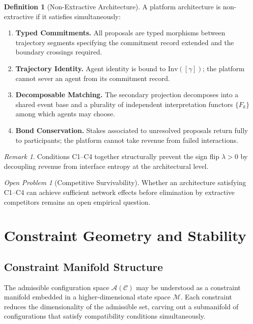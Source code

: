 \documentclass[11pt]{article}
\theoremstyle{plain}
\theoremstyle{definition}
\newtheorem{definition}[theorem]{Definition}
\theoremstyle{remark}
\newtheorem{remark}[theorem]{Remark}
\newtheorem{openproblem}[theorem]{Open Problem}
\begin{document}
\begin{definition}[Non-Extractive Architecture]
A platform architecture is non-extractive if it satisfies simultaneously:
\begin{enumerate}[label=\textbf{C\arabic*.}, leftmargin=2em]
  \item \textbf{Typed Commitments.} All proposals are typed morphisms
  between trajectory segments specifying the commitment record extended
  and the boundary crossings required.
  \item \textbf{Trajectory Identity.} Agent identity is bound to
  $\mathrm{Inv}([\gamma])$; the platform cannot sever an agent from its
  commitment record.
  \item \textbf{Decomposable Matching.} The secondary projection decomposes
  into a shared event base and a plurality of independent interpretation
  functors $\{F_k\}$ among which agents may choose.
  \item \textbf{Bond Conservation.} Stakes associated to unresolved
  proposals return fully to participants; the platform cannot take revenue
  from failed interactions.
\end{enumerate}
\end{definition}

\begin{remark}
Conditions C1--C4 together structurally prevent the sign flip $\lambda > 0$
by decoupling revenue from interface entropy at the architectural level.
\end{remark}

\begin{openproblem}[Competitive Survivability]
Whether an architecture satisfying C1--C4 can achieve sufficient network
effects before elimination by extractive competitors remains an open
empirical question.
\end{openproblem}

\section{Constraint Geometry and Stability}

\subsection{Constraint Manifold Structure}

The admissible configuration space $\mathcal{A}(\mathcal{C})$ may be
understood as a constraint manifold embedded in a higher-dimensional
state space $\mathcal{M}$. Each constraint reduces the dimensionality
of the admissible set, carving out a submanifold of configurations that
satisfy compatibility conditions simultaneously.
\end{document}
